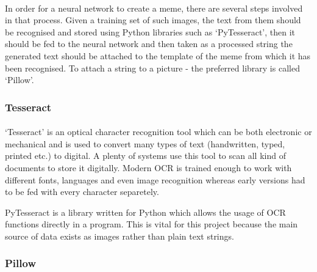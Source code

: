 \documentclass[12pt]{report}
\begin{document}
    \paragraph{}

    In order for a neural network to create a meme, there are several steps involved in that process. Given a training set of such images, the text from them should be recognised and stored using Python libraries such as `PyTesseract', then it should be fed to the neural network and then taken as a processed string
    the generated text should be attached to the template of the meme from which it has been recognised. To attach a string to a picture - the preferred library is called `Pillow'.

    \subsubsection{Tesseract}
    \paragraph{}

    `Tesseract' is an optical character recognition tool which can be both electronic or mechanical and is used to convert many types of text (handwritten, typed, printed etc.) to digital. A plenty of systems use this tool to scan all kind of documents to store it digitally.
    Modern OCR is trained enough to work with different fonts, languages and even image recognition whereas early versions had to be fed with every character separetely.

    PyTesseract is a library written for Python which allows the usage of OCR functions directly in a program. This is vital for this project because the main source of data exists as images rather than plain text strings.

    \subsubsection{Pillow}
    \paragraph{}

    {}
    
\end{document}
